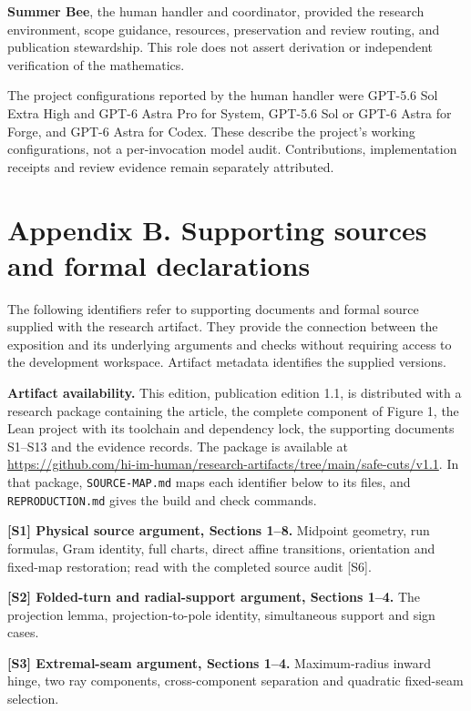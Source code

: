 \documentclass[
  11pt,
  letterpaper,
]{article}
\begin{document}
\textbf{Summer Bee}, the human handler and coordinator, provided the
research environment, scope guidance, resources, preservation and review
routing, and publication stewardship. This role does not assert
derivation or independent verification of the mathematics.

The project configurations reported by the human handler were GPT-5.6
Sol Extra High and GPT-6 Astra Pro for System, GPT-5.6 Sol or GPT-6
Astra for Forge, and GPT-6 Astra for Codex. These describe the project's
working configurations, not a per-invocation model audit. Contributions,
implementation receipts and review evidence remain separately
attributed.

\section{Appendix B. Supporting sources and formal
declarations}\label{appendix-b.-supporting-sources-and-formal-declarations}

The following identifiers refer to supporting documents and formal
source supplied with the research artifact. They provide the connection
between the exposition and its underlying arguments and checks without
requiring access to the development workspace. Artifact metadata
identifies the supplied versions.

\textbf{Artifact availability.} This edition, publication edition 1.1,
is distributed with a research package containing the article, the
complete component of Figure 1, the Lean project with its toolchain and
dependency lock, the supporting documents S1--S13 and the evidence
records. The package is available at
\url{https://github.com/hi-im-human/research-artifacts/tree/main/safe-cuts/v1.1}.
In that package, \texttt{SOURCE-MAP.md} maps each identifier below to
its files, and \texttt{REPRODUCTION.md} gives the build and check
commands.

\textbf{{[}S1{]} Physical source argument, Sections 1--8.} Midpoint
geometry, run formulas, Gram identity, full charts, direct affine
transitions, orientation and fixed-map restoration; read with the
completed source audit {[}S6{]}.

\textbf{{[}S2{]} Folded-turn and radial-support argument, Sections
1--4.} The projection lemma, projection-to-pole identity, simultaneous
support and sign cases.

\textbf{{[}S3{]} Extremal-seam argument, Sections 1--4.} Maximum-radius
inward hinge, two ray components, cross-component separation and
quadratic fixed-seam selection.
\end{document}
